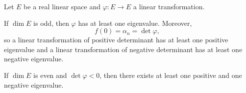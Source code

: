 Let $E$ be a real linear space and $\varphi: E \to E$ a linear transformation.

If $\dim E$ is odd, then $\varphi$ has at least one eigenvalue. Moreover,
$$f(0) = \alpha_n = \det \varphi,$$
so a linear transformation of positive determinant has at least one positive eigenvalue and a linear transformation of negative determinant has at least one negative eigenvalue.

If $\dim E$ is even and $\det \varphi < 0$, then there exists at least one positive and one negative eigenvalue.
